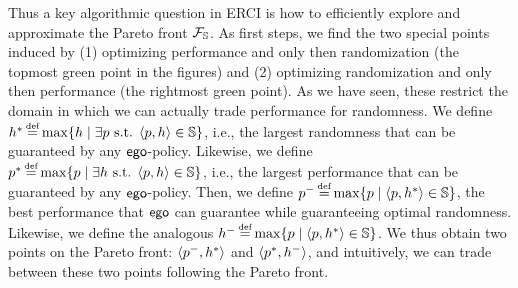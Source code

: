 
Thus a key algorithmic question in ERCI is how to efficiently explore
and approximate the Pareto front $\mathcal{F}_{\mathbb{S}}$. As first steps, we find the two special points induced by (1) optimizing performance and only then randomization (the topmost green point in the figures) and (2) optimizing randomization and only then performance (the rightmost green point). 
As we have seen, these restrict the domain in which we can actually trade performance for randomness. 
We define 
$\rndopt \eqdef \max \{ \rndp \mid \exists \scp \text{ s.t. } \langle \scp, \rndp \rangle \in \solutions  \} $, i.e., the largest randomness that can be guaranteed by any $\mathsf{ego}$-policy. 
Likewise, we define 
$\scopt \eqdef \max \{ \scp \mid \exists \rndp \text{ s.t. } \langle \scp, \rndp \rangle \in \solutions  \} $, i.e., the largest performance that can be guaranteed by any $\mathsf{ego}$-policy. 
Then, we define 
$\scmin \eqdef \max \{ \scp \mid \langle \scp, \rndopt \rangle  \in \solutions \}$, the best performance that $\mathsf{ego}$ can guarantee while guaranteeing optimal randomness. 
Likewise, we define  the analogous $\rndmin \eqdef \max \{ \scp \mid \langle \scp, \rndopt \rangle  \in \solutions \}$.
We thus obtain two points on the Pareto front: $\langle p^{-}, h^{*} \rangle$ and $\langle p^{*}, h^{-} \rangle$, and intuitively, we can trade between these two points following the Pareto front.

